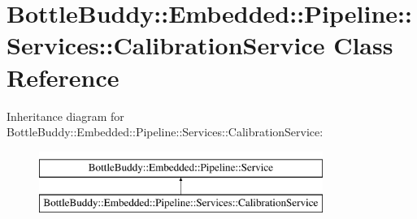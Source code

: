 \hypertarget{class_bottle_buddy_1_1_embedded_1_1_pipeline_1_1_services_1_1_calibration_service}{}\section{Bottle\+Buddy\+:\+:Embedded\+:\+:Pipeline\+:\+:Services\+:\+:Calibration\+Service Class Reference}
\label{class_bottle_buddy_1_1_embedded_1_1_pipeline_1_1_services_1_1_calibration_service}
Inheritance diagram for Bottle\+Buddy\+:\+:Embedded\+:\+:Pipeline\+:\+:Services\+:\+:Calibration\+Service\+:\begin{figure}[H]
\begin{center}
\leavevmode
\includegraphics[height=2.000000cm]{class_bottle_buddy_1_1_embedded_1_1_pipeline_1_1_services_1_1_calibration_service}
\end{center}
\end{figure}

